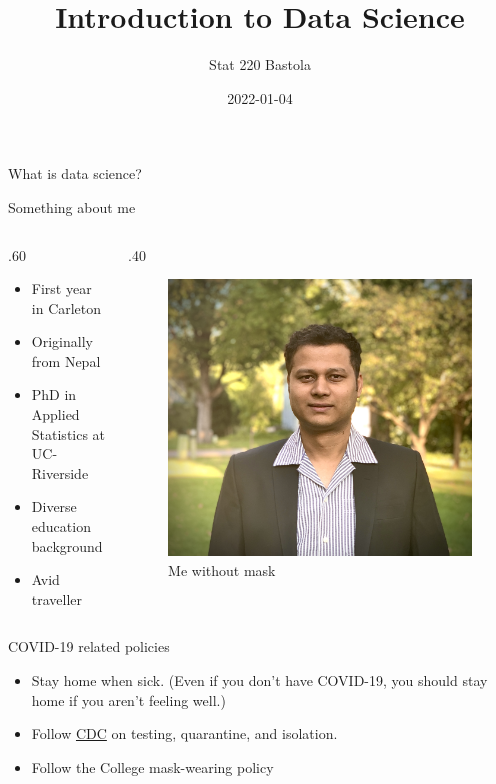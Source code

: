 \documentclass[
  10pt,
  ignorenonframetext,
]{beamer}
\title{Introduction to Data Science}
\author{Stat 220 Bastola}
\date{2022-01-04}
\def\begincols{\begin{columns}}
\def\begincol{\begin{column}}
\def\endcol{\end{column}}
\def\endcols{\end{columns}}
\begin{document}
\frame{\titlepage}

\begin{frame}{What is data science?}
\protect\hypertarget{what-is-data-science}{}
\end{frame}

\begin{frame}{Something about me}
\protect\hypertarget{something-about-me}{}
\begincols
  \begincol{.60\textwidth}
\begin{itemize}
    \item First year in Carleton
    \item Originally from Nepal
    \item PhD in Applied Statistics at UC-Riverside
    \item Diverse education background
    \item Avid traveller
\end{itemize}

\endcol
\begincol{.40\textwidth}

\begin{figure}
\centering
\includegraphics{Deepak.jpg}
\caption{Me without mask}
\end{figure}

\endcol \endcols
\end{frame}

\begin{frame}{COVID-19 related policies}
\protect\hypertarget{covid-19-related-policies}{}
\begin{itemize}
\item Stay home when sick. (Even if you don’t have COVID-19, you should stay home if you aren’t feeling well.)
\item Follow \href{https://www.cdc.gov/coronavirus/2019-ncov/vaccines/fully-vaccinated.html}{CDC} on testing, quarantine, and isolation.
\item Follow the College mask-wearing policy
\end{itemize}
\end{frame}
\end{document}
